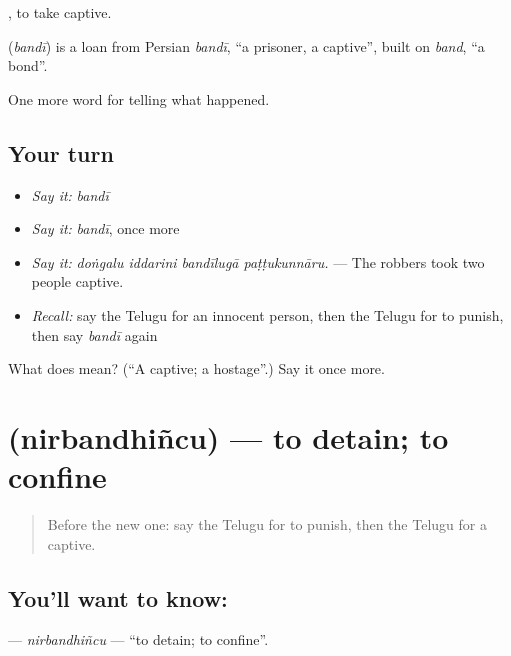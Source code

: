  , to take captive.

\begin{cousinweb}
\textbf{} (\emph{bandī}) is a loan from Persian \emph{bandī}, \textquotedblleft{}a prisoner, a captive\textquotedblright{}, built on \emph{band}, \textquotedblleft{}a bond\textquotedblright{}.
\end{cousinweb}

\begin{grammarlens}[title={What you've built}]
One more word for telling what happened.
\end{grammarlens}

\subsection*{Your turn}
\begin{itemize}
\raggedright
  \item \emph{Say it:} \emph{bandī}
  \item \emph{Say it:} \emph{bandī}, once more
  \item \emph{Say it:} \emph{doṅgalu iddarini bandīlugā paṭṭukunnāru.} — The robbers took two people captive.
  \item \emph{Recall:} say the Telugu for an innocent person, then the Telugu for to punish, then say \emph{bandī} again
\end{itemize}

\begin{tcolorbox}[breakable,colback=teal!4,colframe=teal!35!black,title={Before you move on}]
What does  mean? (\textquotedblleft{}A captive; a hostage\textquotedblright{}.) Say it once more.
\end{tcolorbox}
\section[\texorpdfstring{\te{నిర్బంధించు} (nirbandhiñcu)}{నిర్బంధించు (nirbandhiñcu)}]{ (nirbandhiñcu) — to detain; to confine}

\label{lesson:TE-C351-nirbandhincu}



\begin{quote}
Before the new one: say the Telugu for to punish, then the Telugu for a captive.
\end{quote}

\subsection*{You'll want to know: }
\textbf{} — \emph{nirbandhiñcu} — \textquotedblleft{}to detain; to confine\textquotedblright{}.

